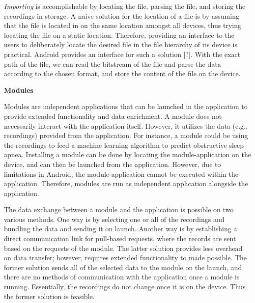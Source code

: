 \textit{Importing} is accomplishable by locating the file, parsing the file, and storing the recordings in storage. A naive solution for the location of a file is by assuming that the file is located in on the same location amongst all devices, thus trying locating the file on a static location. Therefore, providing an interface to the users to deliberately locate the desired file in the file hierarchy of its device is practical. Android provides an interface for such a solution [?]. With the exact path of the file, we can read the bitstream of the file and parse the data according to the chosen format, and store the content of the file on the device.

\noindent \textbf{Modules}

\noindent Modules are independent applications that can be launched in the application to provide extended functionality and data enrichment. A module does not necessarily interact with the application itself. However, it utilizes the data (e.g., recordings) provided from the application. For instance, a module could be using the recordings to feed a machine learning algorithm to predict obstructive sleep apnea. Installing a module can be done by locating the module-application on the device, and can then be launched from the application. However, due to limitations in Android, the module-application cannot be executed within the application. Therefore, modules are run as independent application alongside the application.

The data exchange between a module and the application is possible on two various methods. One way is by selecting one or all of the recordings and bundling the data and sending it on launch. Another way is by establishing a direct communication link for pull-based requests, where the records are sent based on the requests of the module. The latter solution provides less overhead on data transfer; however, requires extended functionality to made possible. The former solution sends all of the selected data to the module on the launch, and there are no methods of communication with the application once a module is running. Essentially, the recordings do not change once it is on the device. Thus the former solution is feasible. 